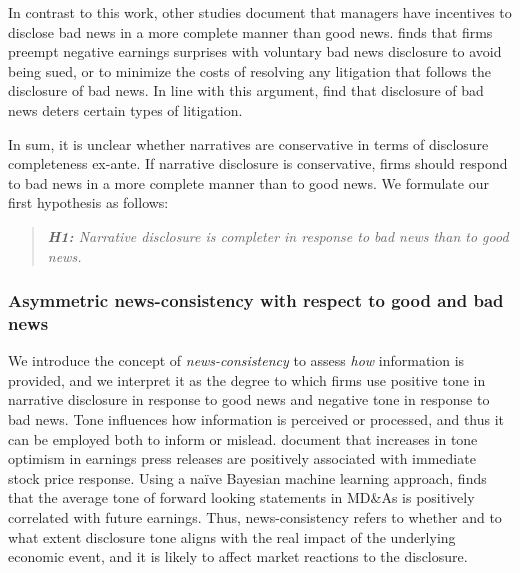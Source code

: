 \documentclass[letterpaper,12pt]{article}
\begin{document}
\begin{spacing}{1.5}
In contrast to this work, other studies document that managers have incentives to disclose bad news in a more complete manner than good news.  finds that firms preempt negative earnings surprises with voluntary bad news disclosure to avoid being sued, or to minimize the costs of resolving any litigation that follows the disclosure of bad news. In line with this argument,  find that disclosure of bad news deters certain types of litigation. 

In sum, it is unclear whether narratives are conservative in terms of disclosure completeness ex-ante. If narrative disclosure is conservative, firms should respond to bad news in a more complete manner than to good news. We formulate our first hypothesis as follows:


\begin{quote}
\textit{\textbf{H1:} \label{hyp:h1} Narrative disclosure is completer in response to bad news than to good news.}
\end{quote}

\subsubsection{Asymmetric news-consistency with respect to good and bad news}

\noindent We introduce the concept of \textit{news-consistency} to assess \textit{how} information is provided, and we interpret it as the degree to which firms use positive tone in narrative disclosure in response to good news and negative tone in response to bad news. %
Tone influences how information is perceived or processed, and thus it can be employed both to inform or mislead.  document that increases in tone optimism in earnings press releases are positively associated with immediate stock price response. Using a naïve Bayesian machine learning approach,  finds that the average tone of forward looking statements in MD\&As is positively correlated with future earnings. Thus, news-consistency refers to whether and to what extent disclosure tone aligns with the real impact of the underlying economic event, and it is likely to affect market reactions to the disclosure. 



\end{spacing}
\end{document}
